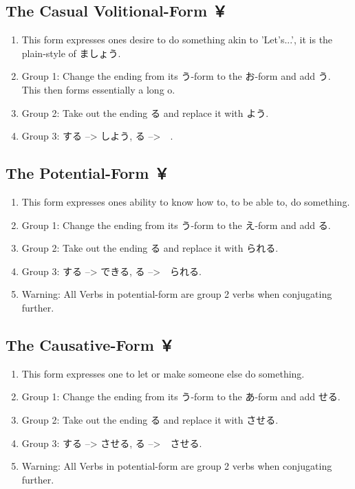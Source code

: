 \documentclass{article}
\begin{document}
\subsection{The Casual Volitional-Form ￥}
\begin{enumerate}
\item This form expresses ones desire to do something akin to 'Let's...',
 it is the plain-style of ましょう.
\item Group 1: Change the ending from its う-form to the お-form and add う.
This then forms essentially a long o.
\item Group 2: Take out the ending る and replace it with よう.
\item Group 3: する --> しよう, る -->　.
\end{enumerate}
\subsection{The Potential-Form ￥}
\begin{enumerate}
\item This form expresses ones ability to know how to, to be able to, do something.
\item Group 1: Change the ending from its う-form to the え-form and add る.
\item Group 2: Take out the ending る and replace it with られる.
\item Group 3: する --> できる, る -->　られる.
\item Warning: All Verbs in potential-form are group 2 verbs when conjugating further.
\end{enumerate}
\subsection{The Causative-Form ￥}	
\begin{enumerate}
\item This form expresses one to let or make someone else do something.
\item Group 1: Change the ending from its う-form to the あ-form and add せる.
\item Group 2: Take out the ending る and replace it with させる.
\item Group 3: する --> させる, る -->　させる.
\item Warning: All Verbs in potential-form are group 2 verbs when conjugating further.
\end{enumerate}
\end{document}
